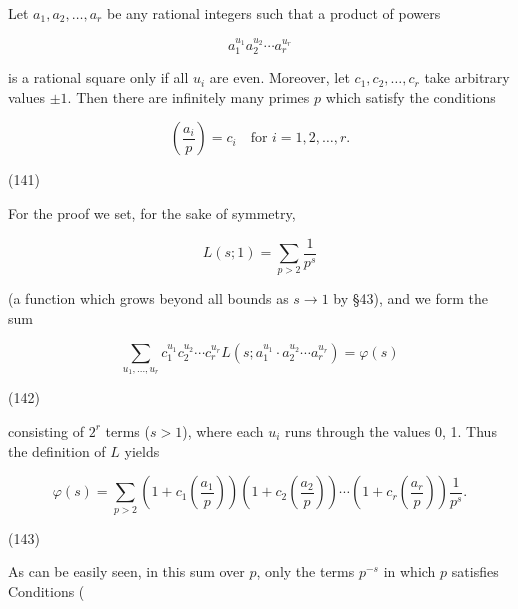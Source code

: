 Let $a_1, a_2, \ldots, a_r$ be any rational integers such that a product of powers

$$a_1^{u_1} a_2^{u_2} \cdots a_r^{u_r}$$

is a rational square only if all $u_i$ are even. Moreover, let $c_1, c_2, \ldots, c_r$ take arbitrary values $\pm 1$. Then there are infinitely many primes $p$ which satisfy the conditions

$$\left( \frac{a_i}{p} \right) = c_i \quad \text{for } i = 1, 2, \ldots, r.$$

(141)

For the proof we set, for the sake of symmetry,

$$L(s; 1) = \sum_{p > 2} \frac{1}{p^s}$$

(a function which grows beyond all bounds as $s \to 1$ by §43), and we form the sum

$$\sum_{u_1, \ldots, u_r} c_1^{u_1} c_2^{u_2} \cdots c_r^{u_r} L(s; a_1^{u_1} \cdot a_2^{u_2} \cdots a_r^{u_r}) = \varphi(s)$$

(142)

consisting of $2^r$ terms ($s > 1$), where each $u_i$ runs through the values 0, 1. Thus the definition of $L$ yields

$$\varphi(s) = \sum_{p > 2} \left( 1 + c_1 \left( \frac{a_1}{p} \right) \right) \left( 1 + c_2 \left( \frac{a_2}{p} \right) \right) \cdots \left( 1 + c_r \left( \frac{a_r}{p} \right) \right) \frac{1}{p^s}.$$

(143)

As can be easily seen, in this sum over $p$, only the terms $p^{-s}$ in which $p$ satisfies Conditions (
